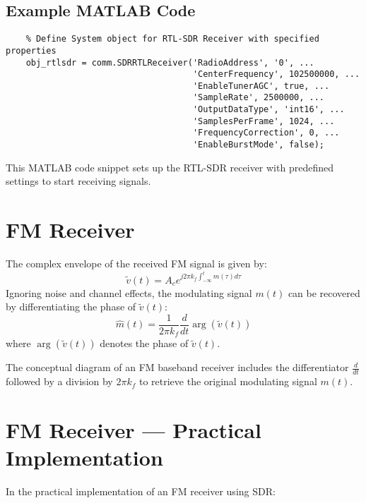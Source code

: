\subsection*{Example MATLAB Code}
\begin{verbatim}
    % Define System object for RTL-SDR Receiver with specified properties
    obj_rtlsdr = comm.SDRRTLReceiver('RadioAddress', '0', ...
                                     'CenterFrequency', 102500000, ...
                                     'EnableTunerAGC', true, ...
                                     'SampleRate', 2500000, ...
                                     'OutputDataType', 'int16', ...
                                     'SamplesPerFrame', 1024, ...
                                     'FrequencyCorrection', 0, ...
                                     'EnableBurstMode', false);
\end{verbatim}
This MATLAB code snippet sets up the RTL-SDR receiver with predefined settings to start receiving signals.


\section*{FM Receiver}

The complex envelope of the received FM signal is given by:
\[
\tilde{v}(t) = A_c e^{j2\pi k_f \int_{-\infty}^{t} m(\tau) d\tau}
\]
Ignoring noise and channel effects, the modulating signal \( m(t) \) can be recovered by differentiating the phase of \( \tilde{v}(t) \):
\[
\hat{m}(t) = \frac{1}{2\pi k_f} \frac{d}{dt} \arg(\tilde{v}(t))
\]
where \( \arg(\tilde{v}(t)) \) denotes the phase of \( \tilde{v}(t) \).

The conceptual diagram of an FM baseband receiver includes the differentiator \( \frac{d}{dt} \) followed by a division by \( 2\pi k_f \) to retrieve the original modulating signal \( m(t) \).

\section*{FM Receiver — Practical Implementation}

In the practical implementation of an FM receiver using SDR:

